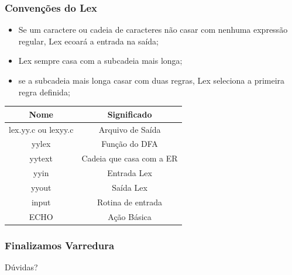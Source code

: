 \documentclass[table]{beamer}
\begin{document}
\begin{frame}
   \frametitle{Convenções do Lex}
   \begin{itemize}
      \item Se um caractere ou cadeia de caracteres não casar com nenhuma expressão regular, Lex ecoará a entrada na saída;
      \item Lex sempre casa com a subcadeia mais longa;
      \item se a subcadeia mais longa casar com duas regras, Lex seleciona a primeira regra definida;
   \end{itemize}

   \begin{table}
      \begin{tabular}{c|c}
      \hline
      Nome & Significado \\
      \hline 
      lex.yy.c ou lexyy.c & Arquivo de Saída \\
      yylex & Função do DFA \\
      yytext & Cadeia que casa com a ER \\
      yyin & Entrada Lex \\
      yyout & Saída Lex \\
      input & Rotina de entrada \\
      ECHO & Ação Básica \\
      \hline
      \end{tabular}
   \end{table}
\end{frame}

\begin{frame}
   \frametitle{Finalizamos Varredura}
   Dúvidas?
\end{frame}
\end{document}
